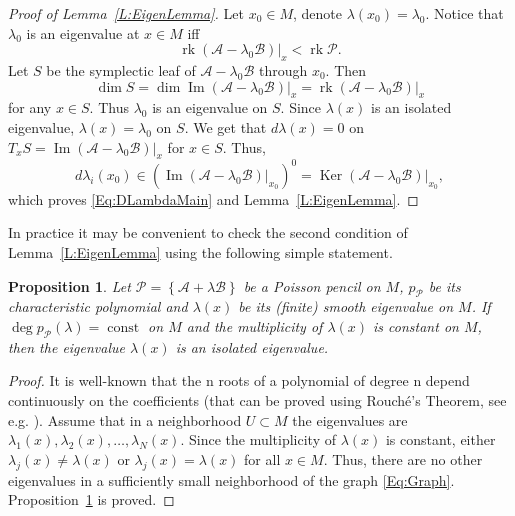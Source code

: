 \documentclass[12pt]{article}
\newtheorem{proposition}[lemma]{Proposition}
\theoremstyle{definition}
\begin{document}
\begin{proof}[Proof of Lemma~\ref{L:EigenLemma}] Let $x_0 \in M$, denote $\lambda(x_0) = \lambda_0$. Notice that $\lambda_0$ is an eigenvalue at $ x \in M$ iff \[ \operatorname{rk} \left( \mathcal{A} - \lambda_0 \mathcal{B}\right) \bigr|_x < \operatorname{rk} \mathcal{P}.\]
Let $S$ be the symplectic leaf of $\mathcal{A} - \lambda_0 \mathcal{B}$ through $x_0$. Then \[\operatorname{dim} S = \operatorname{dim} \operatorname{Im} \left( \mathcal{A} - \lambda_0 \mathcal{B}\right) \bigr|_x = \operatorname{rk}\left( \mathcal{A} - \lambda_0 \mathcal{B}\right) \bigr|_x \] 
for any $x \in S$. Thus $\lambda_0$ is an eigenvalue on $S$. Since $\lambda(x)$ is an isolated eigenvalue,  $\lambda(x) = \lambda_0$ on $S$. We get that $d \lambda(x) = 0$ on $T_x S =\operatorname{Im} \left( \mathcal{A} - \lambda_0 \mathcal{B}\right) \bigr|_x$ for $x \in S$. Thus, \[d \lambda_i(x_0) \in \left(\operatorname{Im} \left( \mathcal{A} - \lambda_0 \mathcal{B}\right) \bigr|_{x_0}\right)^{0} =  \operatorname{Ker} \left( \mathcal{A} - \lambda_0 \mathcal{B}\right) \bigr|_{x_0},\]
which proves \eqref{Eq:DLambdaMain} and Lemma~\ref{L:EigenLemma}.
\end{proof}

In practice it may be convenient to check the second condition of Lemma~\ref{L:EigenLemma} using the following simple statement.

\begin{proposition} \label{Prop:IsolEigen} Let $\mathcal{P} = \left\{\mathcal{A} + \lambda \mathcal{B} \right\}$ be a Poisson pencil on $M$, $p_{\mathcal{P}}$ be its characteristic polynomial and $\lambda(x)$ be its (finite) smooth eigenvalue on $M$. If $\deg p_{\mathcal{P}}(\lambda)= \operatorname{const}$ on $M$ and the multiplicity of $\lambda(x)$ is constant on $M$, then the eigenvalue $\lambda(x)$ is an isolated eigenvalue.  \end{proposition}

\begin{proof} It is well-known that the n roots of a polynomial of degree n depend continuously on the coefficients (that can be proved using Rouch\'{e}’s Theorem, see e.g. \cite{Alexanderian13}). Assume that in a neighborhood $U \subset M$ the eigenvalues are $\lambda_1(x), \lambda_2(x), \dots, \lambda_N(x)$. Since the multiplicity of $\lambda(x)$ is constant, either $\lambda_j(x) \not= \lambda(x)$ or $\lambda_j(x) = \lambda(x)$ for all $x \in M$. Thus, there are no other eigenvalues in a sufficiently small neighborhood of the graph \eqref{Eq:Graph}. Proposition~\ref{Prop:IsolEigen} is proved. \end{proof}
\end{document}
